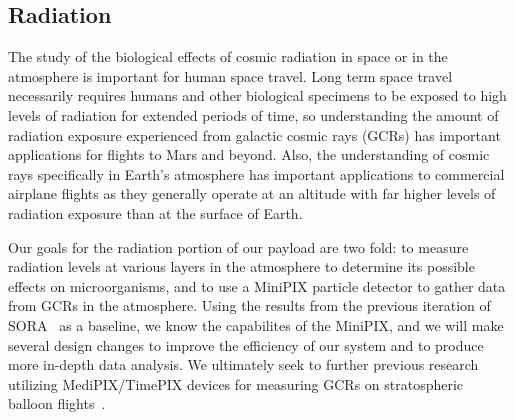 \subsection{Radiation}
\label{sec: Radiation Background}

The study of the biological effects of cosmic radiation in space or in the atmosphere is important for human space travel. Long term space travel necessarily requires humans and other biological specimens to be exposed to high levels of radiation for extended periods of time, so understanding the amount of radiation exposure experienced from galactic cosmic rays (GCRs) has important applications for flights to Mars and beyond. Also, the understanding of cosmic rays specifically in Earth's atmosphere has important applications to commercial airplane flights as they generally operate at an altitude with far higher levels of radiation exposure than at the surface of Earth. 

Our goals for the radiation portion of our payload are two fold: to measure radiation levels at various layers in the atmosphere to determine its possible effects on microorganisms, and to use a MiniPIX particle detector to gather data from GCRs in the atmosphere. Using the results from the previous iteration of SORA~\cite{SORA} as a baseline, we know the capabilites of the MiniPIX, and we will make several design changes to improve the efficiency of our system and to produce more in-depth data analysis. We ultimately seek to further previous research utilizing MediPIX/TimePIX devices for measuring GCRs on stratospheric balloon flights~\cite{bexus}. 



%
%



